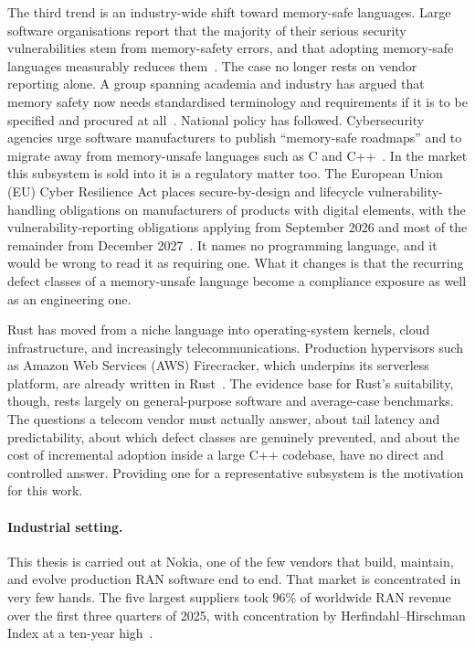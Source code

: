 \documentclass[english,oneside,a4paper,censored,csm,software-track-2020]{HYthesisML}
\begin{document}
The third trend is an industry-wide shift toward memory-safe languages. Large software
organisations report that the majority of their serious security vulnerabilities stem from
memory-safety errors, and that adopting memory-safe languages measurably reduces
them~\cite{msrc2019memory,google2022android,vanderstoep2025android,google2024securebydesign}.
The case no longer rests on vendor reporting alone. A group spanning academia and industry has
argued that memory safety now needs standardised terminology and requirements if it is to be
specified and procured at all~\cite{watson2025memorysafety}. National policy has followed.
Cybersecurity agencies urge software manufacturers to publish ``memory-safe roadmaps'' and to
migrate away from memory-unsafe languages such as C and
C++~\cite{cisa2023memorysafe,oncd2024building}. In the market this subsystem is sold into it is
a regulatory matter too. The European Union (EU) Cyber Resilience Act places secure-by-design
and lifecycle vulnerability-handling obligations on manufacturers of products with digital
elements, with the vulnerability-reporting obligations applying from September 2026 and most of
the remainder from December 2027~\cite{eu2024cra}. It names no programming language, and it
would be wrong to read it as requiring one. What it changes is that the recurring defect
classes of a memory-unsafe language become a compliance exposure as well as an engineering one.

Rust has moved from a niche language into operating-system kernels, cloud infrastructure, and
increasingly telecommunications. Production hypervisors such as Amazon Web Services (AWS)
Firecracker, which underpins its serverless platform, are already written in
Rust~\cite{agache2020firecracker}. The evidence base for Rust's suitability, though, rests
largely on general-purpose software and average-case benchmarks. The questions a telecom
vendor must actually answer, about tail latency and predictability, about which defect
classes are genuinely prevented, and about the cost of incremental adoption inside a large
C++ codebase, have no direct and controlled answer. Providing one for a representative
subsystem is the motivation for this work.

\paragraph{Industrial setting.}
This thesis is carried out at Nokia, one of the few vendors that build, maintain, and evolve
production RAN software end to end. That market is concentrated in very few hands. The five
largest suppliers took 96\% of worldwide RAN revenue over the first three quarters of 2025,
with concentration by Herfindahl--Hirschman Index at a ten-year
high~\cite{delloro2025ran3q,delloro2026ran}.
\end{document}
